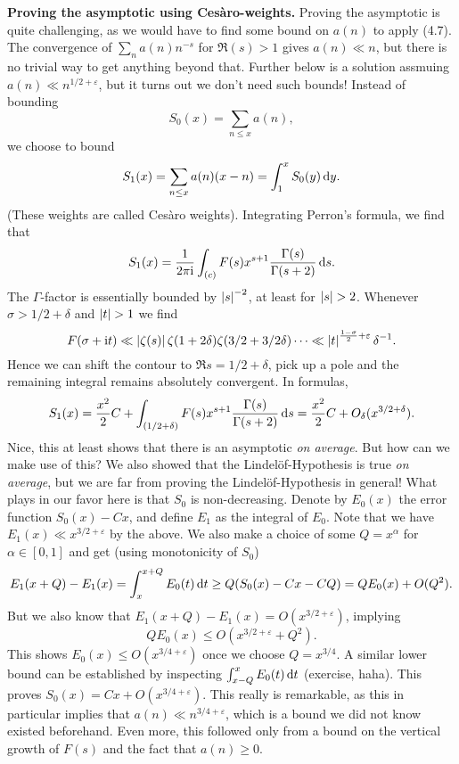 \documentclass[a4paper,11pt]{article}
\begin{document}
\textbf{Proving the asymptotic using Cesàro-weights.} Proving the asymptotic is
quite challenging, as we would have to find some bound on $a(n)$ to apply (4.7).
The convergence of $\sum_n a(n)n^{-s}$ for $\Re (s)>1$ gives $a(n) \ll n$, but 
there is no trivial way to get anything beyond that.
Further below is a solution assmuing $a(n) \ll n^{1/2+\varepsilon}$, but 
it turns out we don't need such bounds! Instead of bounding 
\[
    S_0(x) = \sum_{n \leq x} a(n),
\]
we choose to bound
\[
    S_1(x) = \sum_{n \leq x} a(n) (x-n) = \int_1^x S_0(y) \mathrm{\,d} y.
\]
(These weights are called Cesàro weights). 
Integrating Perron's formula, we find that 
\[
    S_1(x) = \frac{1}{2 \pi \mathrm i} \int_{(c)} F(s) x^{s+1} \frac{\Gamma(s)}{\Gamma(s+2)} \mathrm{\,d} s.
\]
The $\Gamma$-factor is essentially bounded by $\left\lvert s \right\rvert^{-2}$, at least for 
$\left\lvert s \right\rvert > 2$. Whenever $\sigma > 1/2 + \delta$ and $\left\lvert t \right\rvert > 1$ we find  
$$F(\sigma + \mathrm i t) \ll \left\lvert \zeta(s) \right\rvert \zeta(1+2\delta) \zeta(3/2+3/2\delta) \cdots
\ll \left\lvert t \right\rvert^{\frac {1-\sigma}2 + \varepsilon} \delta^{-1}.$$
Hence we can shift the contour to $\Re s = 1/2+\delta$, pick up a pole and the 
remaining integral remains absolutely convergent. In formulas,
\[
    S_1(x) = \frac{x^2}2 C + \int_{(1/2+\delta)} F(s) x^{s+1}
    \frac{\Gamma(s)}{\Gamma(s+2)} \mathrm{\,d} s = \frac{x^2}2 C +
    O_\delta(x^{3/2+\delta}).
\]
Nice, this at least shows that there is an asymptotic \textit{on average}. But
how can we make use of this? We also showed that the Lindelöf-Hypothesis is true
\textit{on average}, but we are far from proving the Lindelöf-Hypothesis in
general! What plays in our favor here is that $S_0$ is non-decreasing. Denote
by $E_0(x)$ the error function $S_0(x) - Cx$, and define $E_1$ as the integral
of $E_0$. Note that we have $E_1(x) \ll x^{3/2+\varepsilon}$ by the above. 
We also make a choice of some $Q = x^\alpha$ for $\alpha \in [0,1]$ and get
(using monotonicity of $S_0$)
\[
    E_1(x+Q)-E_1(x) = \int_x^{x+Q} E_0(t) \mathrm{\,d} t \geq Q(S_0(x) - Cx - CQ) = QE_0(x) + O(Q^2).
\]
But we also know that $E_1(x+Q)-E_1(x) = O(x^{3/2+\varepsilon})$, implying
\[
    QE_0(x) \leq O(x^{3/2+\varepsilon}+Q^2).
\]
This shows $E_0(x) \leq O(x^{3/4+\varepsilon})$ once we choose $Q=x^{3/4}$. A similar
lower bound can be established by inspecting $\int_{x-Q}^x E_0(t) \mathrm{\,d} t$ (exercise, 
haha). This proves $S_0(x) = Cx + O(x^{3/4+\varepsilon})$. This really is remarkable,
as this in particular implies that $a(n) \ll n^{3/4 + \varepsilon}$, which is a 
bound we did not know existed beforehand. Even more, this followed only from a
bound on the vertical growth of $F(s)$ and the fact 
that $a(n) \geq 0$. 
\end{document}
